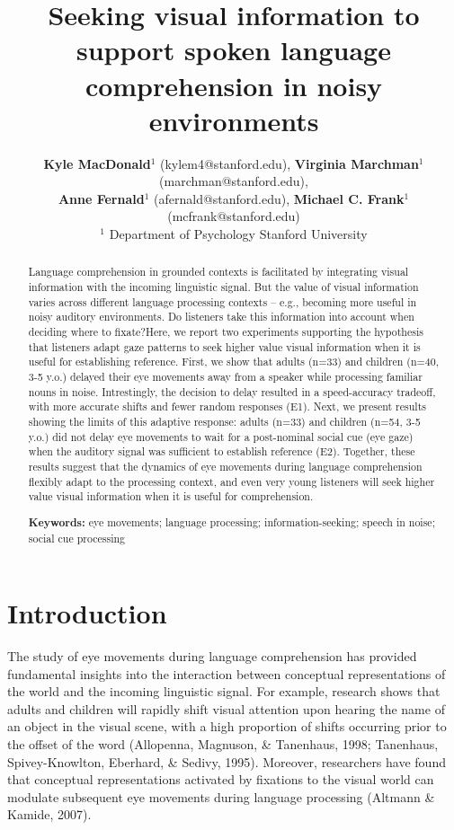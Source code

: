 \documentclass[10pt, letterpaper]{article}
\title{Seeking visual information to support spoken language comprehension in
noisy environments}
\author{ {\large \bf Kyle MacDonald}$^1$ (kylem4@stanford.edu), {\large \bf Virginia Marchman}$^1$ (marchman@stanford.edu),  \\ {\large \bf Anne Fernald}$^1$ (afernald@stanford.edu), {\large \bf Michael C. Frank}$^1$ (mcfrank@stanford.edu) 
  \\ $^1$ Department of Psychology Stanford University}
\begin{document}
\maketitle

\begin{abstract}
Language comprehension in grounded contexts is facilitated by
integrating visual information with the incoming linguistic signal. But
the value of visual information varies across different language
processing contexts -- e.g., becoming more useful in noisy auditory
environments. Do listeners take this information into account when
deciding where to fixate?Here, we report two experiments supporting the
hypothesis that listeners adapt gaze patterns to seek higher value
visual information when it is useful for establishing reference. First,
we show that adults (n=33) and children (n=40, 3-5 y.o.) delayed their
eye movements away from a speaker while processing familiar nouns in
noise. Intrestingly, the decision to delay resulted in a speed-accuracy
tradeoff, with more accurate shifts and fewer random responses (E1).
Next, we present results showing the limits of this adaptive response:
adults (n=33) and children (n=54, 3-5 y.o.) did not delay eye movements
to wait for a post-nominal social cue (eye gaze) when the auditory
signal was sufficient to establish reference (E2). Together, these
results suggest that the dynamics of eye movements during language
comprehension flexibly adapt to the processing context, and even very
young listeners will seek higher value visual information when it is
useful for comprehension.

\textbf{Keywords:}
eye movements; language processing; information-seeking; speech in
noise; social cue processing
\end{abstract}

\section{Introduction}\label{introduction}

The study of eye movements during language comprehension has provided
fundamental insights into the interaction between conceptual
representations of the world and the incoming linguistic signal. For
example, research shows that adults and children will rapidly shift
visual attention upon hearing the name of an object in the visual scene,
with a high proportion of shifts occurring prior to the offset of the
word (Allopenna, Magnuson, \& Tanenhaus, 1998; Tanenhaus,
Spivey-Knowlton, Eberhard, \& Sedivy, 1995). Moreover, researchers have
found that conceptual representations activated by fixations to the
visual world can modulate subsequent eye movements during language
processing (Altmann \& Kamide, 2007).
\end{document}
